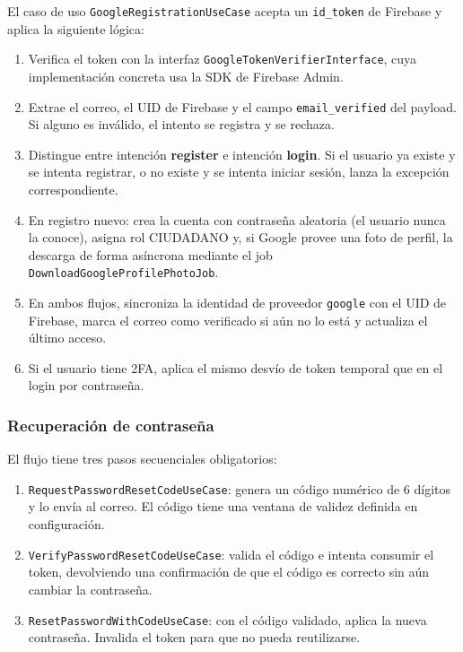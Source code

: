 \documentclass[12pt,a4paper]{article}
\begin{document}
El caso de uso \texttt{GoogleRegistrationUseCase} acepta un \texttt{id\_token}
de Firebase y aplica la siguiente lógica:
\begin{enumerate}
    \item Verifica el token con la interfaz \texttt{GoogleTokenVerifierInterface},
          cuya implementación concreta usa la SDK de Firebase Admin.
    \item Extrae el correo, el UID de Firebase y el campo \texttt{email\_verified}
          del payload. Si alguno es inválido, el intento se registra y se rechaza.
    \item Distingue entre intención \textbf{register} e intención \textbf{login}.
          Si el usuario ya existe y se intenta registrar, o no existe y se intenta
          iniciar sesión, lanza la excepción correspondiente.
    \item En registro nuevo: crea la cuenta con contraseña aleatoria (el usuario
          nunca la conoce), asigna rol CIUDADANO y, si Google provee una foto de
          perfil, la descarga de forma asíncrona mediante el job
          \texttt{DownloadGoogleProfilePhotoJob}.
    \item En ambos flujos, sincroniza la identidad de proveedor \texttt{google}
          con el UID de Firebase, marca el correo como verificado si aún no lo está
          y actualiza el último acceso.
    \item Si el usuario tiene 2FA, aplica el mismo desvío de token temporal
          que en el login por contraseña.
\end{enumerate}

\subsubsection*{Recuperación de contraseña}

El flujo tiene tres pasos secuenciales obligatorios:
\begin{enumerate}
    \item \texttt{RequestPasswordResetCodeUseCase}: genera un código numérico de
          6 dígitos y lo envía al correo. El código tiene una ventana de validez
          definida en configuración.
    \item \texttt{VerifyPasswordResetCodeUseCase}: valida el código e intenta
          consumir el token, devolviendo una confirmación de que el código es
          correcto sin aún cambiar la contraseña.
    \item \texttt{ResetPasswordWithCodeUseCase}: con el código validado, aplica
          la nueva contraseña. Invalida el token para que no pueda reutilizarse.
\end{enumerate}
\end{document}
